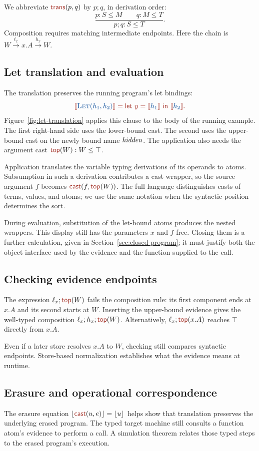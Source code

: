 We abbreviate $\ev{trans}(p,q)$ by $p;q$, in derivation order:
\[
 \frac{p:S\le M\qquad q:M\le T}{p;q:S\le T}.
\]
Composition requires matching intermediate endpoints. Here the chain is
$W\xrightarrow{\ell_x}x.A\xrightarrow{h_x}W$.

\subsection*{Let translation and evaluation}
The translation preserves the running program's let bindings:
\[
\tgt{
\tr{\textsc{Let}(h_1,h_2)}
=\ev{let}\ y=\tr{h_1}\ \ev{in}\ \tr{h_2}.}
\]
Figure~\ref{fig:let-translation} applies this clause to the body of the
running example. The first right-hand side uses the lower-bound cast.
The second uses the upper-bound cast on the newly bound name
$\mathit{hidden}$. The application also needs the argument cast
$\ev{top}(W):W\le\top$.

Application translates the variable typing derivations of its operands
to atoms. Subsumption in such a derivation contributes a cast wrapper,
so the source argument $f$ becomes $\cast{f}{\ev{top}(W)}$.
The full language distinguishes casts of terms, values, and atoms;
we use the same notation when the syntactic position determines the sort.





During evaluation, substitution of the let-bound atoms produces the
nested wrappers. This display still has the parameters $x$ and $f$ free.
Closing them is a further calculation, given in
Section~\ref{sec:closed-program}; it must justify both the object
interface used by the evidence and the function supplied to the call.

\subsection*{Checking evidence endpoints}
The expression $\ell_x;\ev{top}(W)$ fails the composition rule:
its first component ends at $x.A$ and its second starts at $W$.
Inserting the upper-bound evidence gives the well-typed composition
$\ell_x;h_x;\ev{top}(W)$. Alternatively,
$\ell_x;\ev{top}(x.A)$ reaches $\top$ directly from $x.A$.

Even if a later store resolves $x.A$ to $W$, checking still compares
syntactic endpoints. Store-based normalization establishes what the
evidence means at runtime.

\subsection*{Erasure and operational correspondence}
The erasure equation $\erase{\cast{u}{e}}=\erase{u}$ helps show that
translation preserves the underlying erased program.
The typed target machine still consults a function atom's
evidence to perform a call. A simulation theorem relates those typed
steps to the erased program's execution.

